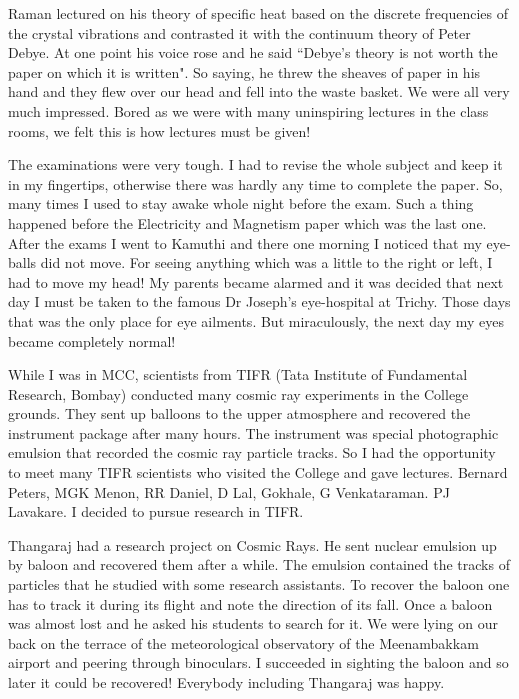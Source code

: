 Raman lectured on his theory of specific heat based on the discrete 
frequencies of the crystal vibrations and contrasted it with the 
continuum theory of Peter Debye. At one point his voice rose and he said 
``Debye's theory is not worth the paper on which it is written". So 
saying, he threw the sheaves of paper in his hand and they flew over our 
head and fell into the waste basket. We were all very much impressed. 
Bored as we were with many uninspiring lectures in the class rooms, we 
felt this is how lectures must be given!


The examinations were very tough. I had to revise the whole subject and 
keep it in my fingertips, otherwise there was hardly any time to 
complete the paper. So, many times I used to stay awake whole night 
before the exam. Such a thing happened before the Electricity and 
Magnetism paper which was the last one. After the exams I went to 
Kamuthi and there one morning I noti\-ced that my eye-balls did not move. 
For seeing anything which was a little to the right or left, I had to 
move my head! My pa\-rents became alarmed and it was decided that next day 
I must be taken to the famous Dr Joseph's eye-hospital at Trichy. Those 
days that was the only place for eye ailments. But miraculously, the 
next day my eyes became completely normal!

While I was in MCC, scientists from TIFR (Tata Institute of Fundamental 
Research, Bombay) conducted many cosmic ray experiments in the College 
grounds. They sent up balloons to the upper atmosphere and recovered the 
instrument package after many hours. The instrument was special 
photographic emulsion that recorded the cosmic ray particle tracks. So I 
had the opportunity to meet many TIFR scientists who visited the Co\-llege 
and gave lectures. Bernard Peters, MGK Menon, RR Daniel, D Lal, Gokhale, 
G Venkataraman. PJ Lavakare. I decided to pursue research in TIFR.

Thangaraj had a research project on Cosmic Rays. He sent nuclear 
emulsion up by baloon and recovered them after a while. The emulsion 
contained the tracks of particles that he studied with some research 
assistants. To recover the baloon one has to track it during its flight 
and note the direction of its fall. Once a baloon was almost lost and he 
asked his students to search for it. We were lying on our back on the 
terrace of the meteorological observatory of the Meenambakkam airport 
and peering through binoculars. I succeeded in sighting the baloon and 
so later it could be recovered! Everybody including Thangaraj was happy.
\vspace{-\topsep}
